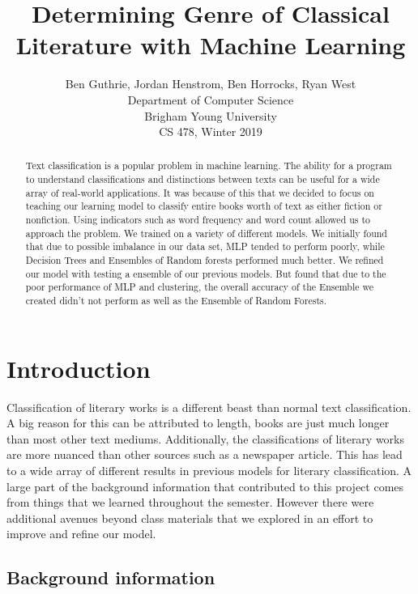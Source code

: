 \documentclass{article}
\title{Determining Genre of Classical Literature with Machine Learning}
\author{Ben Guthrie, Jordan Henstrom, Ben Horrocks, Ryan West \\
Department of Computer Science\\
Brigham Young University \\
CS 478, Winter 2019}
\begin{document}
\maketitle

\begin{abstract}
Text classification is a popular problem in machine learning. The ability for a program to understand classifications and distinctions between texts can be useful for a wide array of real-world applications. It was because of this that we decided to focus on teaching our learning model to classify entire books worth of text as either fiction or nonfiction. Using indicators such as word frequency and word count allowed us to approach the problem. We trained on a variety of different models. We initially found that due to possible imbalance in our data set, MLP tended to perform poorly, while Decision Trees and Ensembles of Random forests performed much better. We refined our model with testing a ensemble of our previous models. But found that due to the poor performance of MLP and clustering, the overall accuracy of the Ensemble we created didn’t not perform as well as the Ensemble of Random Forests.
\end{abstract}

\section{Introduction}

Classification of literary works is a different beast than normal text classification. A big reason for this can be attributed to length, books are just much longer than most other text mediums. Additionally, the classifications of literary works are more nuanced than other sources such as a newspaper article. This has lead to a wide array of different results in previous models for literary classification. A large part of the background information that contributed to this project comes from things that we learned throughout the semester. However there were additional avenues beyond class materials that we explored in an effort to improve and refine our model. \par

\subsection{Background information}
\end{document}
